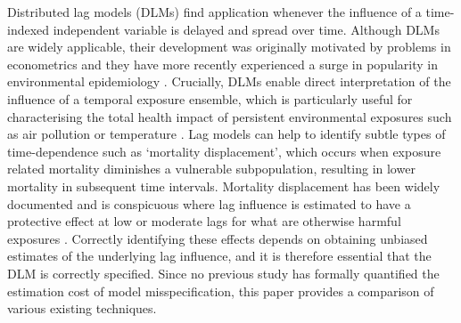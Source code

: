 \documentclass[11pt]{article}
\begin{document}
Distributed lag models (DLMs) find application whenever the influence of a
time-indexed independent variable is delayed and spread over time. Although
DLMs are widely applicable, their development was originally motivated by
problems in econometrics \citep{nerlove1958, almon1965, zellner1970, haugh1977}
and they have more recently experienced a surge in popularity in environmental
epidemiology \citep{zanobetti2000, welty2009, gasparrini2010}. Crucially, DLMs
enable direct interpretation of the influence of a temporal exposure ensemble,
which is particularly useful for characterising the total health impact of
persistent environmental exposures such as air pollution or temperature
\citep{wyzga1978, gasparrini2010}. Lag models can help to identify subtle types
of time-dependence such as `mortality displacement', which occurs when exposure
related mortality diminishes a vulnerable subpopulation, resulting in lower
mortality in subsequent time intervals. Mortality displacement has been widely
documented \citep{schwartz2000, braga2001} and is conspicuous where lag
influence is estimated to have a protective effect at low or moderate lags for
what are otherwise harmful exposures \citep{zanobetti2000}. Correctly
identifying these effects depends on obtaining unbiased estimates of the
underlying lag influence, and it is therefore essential that the DLM is
correctly specified. Since no previous study has formally quantified the
estimation cost of model misspecification, this paper provides a comparison of
various existing techniques.
\end{document}
